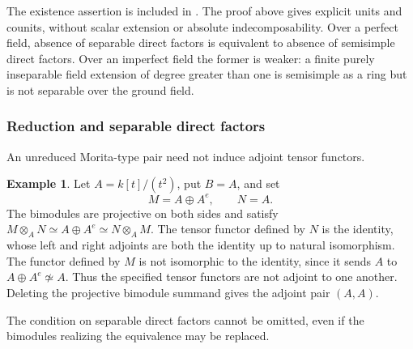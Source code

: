 \documentclass[12pt,a4paper,english,reqno]{amsart}
\numberwithin{equation}{section}
\theoremstyle{plain}
\theoremstyle{definition}
\newtheorem{example}[theorem]{Example}
\begin{document}
The existence assertion is included in
\cite[Lemma~3.11]{XZ2026}.  The proof above gives explicit units and
counits, without scalar extension or absolute indecomposability.
Over a perfect field, absence of separable
direct factors is equivalent to absence of semisimple direct
factors.  Over an imperfect field the former is weaker: a finite
purely inseparable field extension of degree greater than one
is semisimple as a ring but is not separable over the ground field.

\subsubsection{Reduction and separable direct factors}

An unreduced Morita-type pair need not induce adjoint tensor functors.

\begin{example}
\label{ex:adjoint-added-projective}
Let $A=k[t]/(t^2)$, put $B=A$, and set
\[
 M=A\oplus A^e,\qquad N=A.
\]
The bimodules are projective on both sides and satisfy
$M\otimes_AN\simeq A\oplus A^e\simeq N\otimes_AM$.
The tensor functor defined by $N$ is the identity, whose left
and right adjoints are both the identity up to natural isomorphism.
The functor defined by $M$ is not isomorphic to the identity, since it sends $A$ to
$A\oplus A^e\not\simeq A$.  Thus the specified tensor functors
are not adjoint to one another.  Deleting the projective bimodule
summand gives the adjoint pair $(A,A)$.
\end{example}

The condition on separable direct factors cannot be omitted, even
if the bimodules realizing the equivalence may be replaced.
\end{document}
